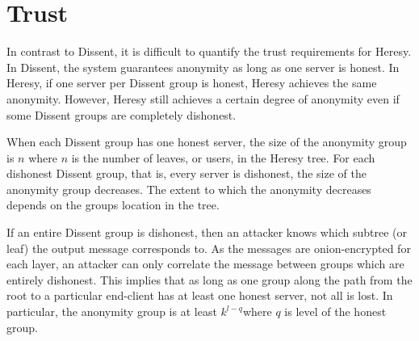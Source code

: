 \section{Trust}

In contrast to Dissent, it is difficult to quantify the trust requirements for Heresy. In Dissent, the system guarantees anonymity as long as one server is honest. In Heresy, if one server per Dissent group is honest, Heresy achieves the same anonymity. However, Heresy still achieves a certain degree of anonymity even if some Dissent groups are completely dishonest.

When each Dissent group has one honest server, the size of the anonymity group is $n$ where $n$ is the number of leaves, or users, in the Heresy tree. For each dishonest Dissent group, that is, every server is dishonest, the size of the anonymity group decreases. The extent to which the anonymity decreases depends on the groups location in the tree. 

If an entire Dissent group is dishonest, then an attacker knows which subtree (or leaf) the output message corresponds to. As the messages are onion-encrypted for each layer, an attacker can only correlate the message between groups which are entirely dishonest. This implies that as long as one group along the path from the root to a particular end-client has at least one honest server, not all is lost. In particular, the anonymity group is at least $k^{l-q}$where $q$ is level of the honest group.
